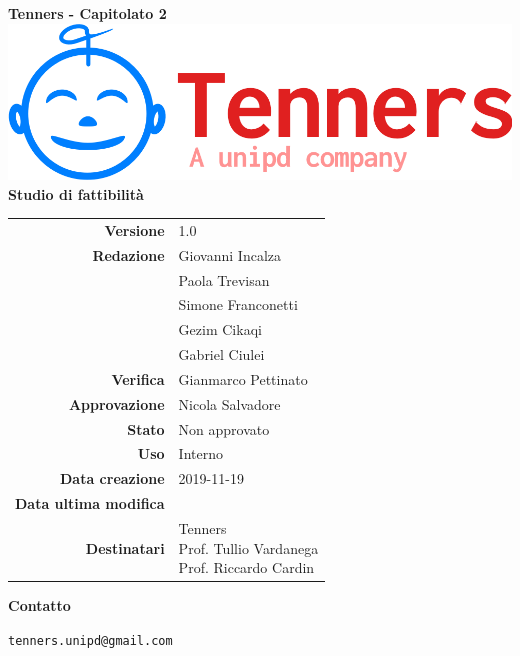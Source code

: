 \begin{titlepage}
	\begin{center}
		\large \textbf{Tenners - Capitolato 2}
		\vfill
		\includegraphics[scale = 0.3]{./res/img/logo.png}\\
		\vfill
		\Huge \textbf{Studio di fattibilità}

        \vfill
        \large

        \begin{tabular}{r|l}
                        \textbf{Versione} & 1.0 \\
                        \textbf{Redazione} &
                        Giovanni Incalza \\&
                        Paola Trevisan \\&
	                    Simone Franconetti\\&
	                    Gezim Cikaqi\\&
                        Gabriel Ciulei \\
                        \textbf{Verifica} & 
                        Gianmarco Pettinato \\
                        \textbf{Approvazione} & Nicola Salvadore \\
                        \textbf{Stato} & Non approvato \\
                        \textbf{Uso} &  Interno\\
                        \textbf{Data creazione} &  2019-11-19\\
                        \textbf{Data ultima modifica} &  \\
                        \textbf{Destinatari} & \parbox[t]{5cm}{Tenners\\Prof. Tullio Vardanega\\Prof. Riccardo Cardin}
                \end{tabular}
                \vfill
                \normalsize
                \vfill
                \textbf{Contatto}
                
                \texttt{tenners.unipd@gmail.com}

	\end{center}
\end{titlepage}